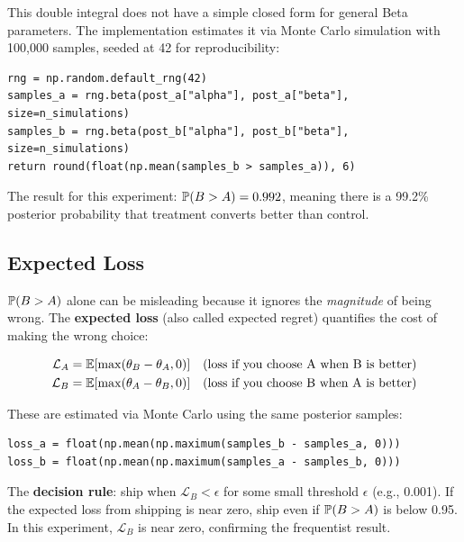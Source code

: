 This double integral does not have a simple closed form for general Beta
parameters. The implementation estimates it via Monte Carlo simulation with
100,000 samples, seeded at 42 for reproducibility:

\begin{lstlisting}[style=python, caption={P(B > A) Monte Carlo (stats\_engine.py lines 166--169)}]
rng = np.random.default_rng(42)
samples_a = rng.beta(post_a["alpha"], post_a["beta"], size=n_simulations)
samples_b = rng.beta(post_b["alpha"], post_b["beta"], size=n_simulations)
return round(float(np.mean(samples_b > samples_a)), 6)
\end{lstlisting}

The result for this experiment: $\operatorname{\mathbb{P}}(B > A) = 0.992$, meaning there is
a 99.2\% posterior probability that treatment converts better than control.

\subsection{Expected Loss}

$\operatorname{\mathbb{P}}(B > A)$ alone can be misleading because it ignores the \emph{magnitude}
of being wrong. The \textbf{expected loss} (also called expected regret)
quantifies the cost of making the wrong choice:

\begin{align}
  \mathcal{L}_A &= \operatorname{\mathbb{E}}\!\left[\max(\theta_B - \theta_A, 0)\right]
    &\text{(loss if you choose A when B is better)} \label{eq:loss-a}\\
  \mathcal{L}_B &= \operatorname{\mathbb{E}}\!\left[\max(\theta_A - \theta_B, 0)\right]
    &\text{(loss if you choose B when A is better)} \label{eq:loss-b}
\end{align}

These are estimated via Monte Carlo using the same posterior samples:

\begin{lstlisting}[style=python, caption={Expected loss (stats\_engine.py lines 188--190)}]
loss_a = float(np.mean(np.maximum(samples_b - samples_a, 0)))
loss_b = float(np.mean(np.maximum(samples_a - samples_b, 0)))
\end{lstlisting}

The \textbf{decision rule}: ship when $\mathcal{L}_B < \epsilon$ for some
small threshold $\epsilon$ (e.g., 0.001). If the expected loss from shipping
is near zero, ship even if $\operatorname{\mathbb{P}}(B > A)$ is below 0.95. In this experiment,
$\mathcal{L}_B$ is near zero, confirming the frequentist result.

